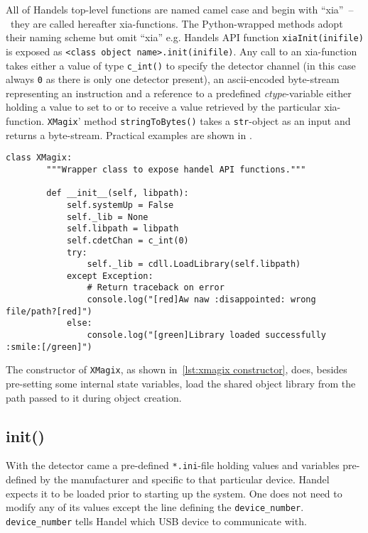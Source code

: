         All of Handels top-level functions are named camel case and begin with ``xia''~--~they are called hereafter xia-functions.
        The Python-wrapped methods adopt their naming scheme but omit ``xia'' e.g. Handels API function \texttt{xiaInit(inifile)} is exposed as \texttt{<class object name>.init(inifile)}.
        Any call to an xia-function takes either a value of type \texttt{c\_int()} to specify the detector channel (in this case always \texttt{0} as there is only one detector present), an ascii-encoded byte-stream representing an instruction and a reference to a predefined \textit{ctype}-variable either holding a value to set to or to receive a value retrieved by the particular xia-function.
        \texttt{XMagix}' method \texttt{stringToBytes()} takes a \texttt{str}-object as an input and returns a byte-stream.
        Practical examples are shown in .

        \begin{lstlisting}[style=mypython, firstnumber=13, caption={[XMagix class constructor]XMagix class constructor.}, label={lst:xmagix constructor}]
    class XMagix:
        """Wrapper class to expose handel API functions."""

        def __init__(self, libpath):
            self.systemUp = False
            self._lib = None
            self.libpath = libpath
            self.cdetChan = c_int(0)
            try:
                self._lib = cdll.LoadLibrary(self.libpath)
            except Exception:
                # Return traceback on error
                console.log("[red]Aw naw :disappointed: wrong file/path?[red]")
            else:
                console.log("[green]Library loaded successfully :smile:[/green]")
        \end{lstlisting}
        The constructor of \texttt{XMagix}, as shown in~\cref{lst:xmagix constructor}, does, besides pre-setting some internal state variables, load the shared object library from the path passed to it during object creation.
        
        \subsection{init()}\label{sec:init}
            With the detector came a pre-defined \texttt{*.ini}-file holding values and variables pre-defined by the manufacturer and specific to that particular device.
            Handel expects it to be loaded prior to starting up the system.
            One does not need to modify any of its values except the line defining the \texttt{device\_number}.
            \texttt{device\_number} tells Handel which USB device to communicate with.\par\medskip
            
